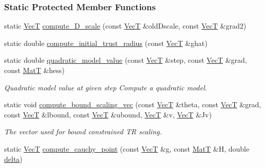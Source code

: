 \subsubsection*{Static Protected Member Functions}
\begin{DoxyCompactItemize}
\item 
static \hyperlink{namespacemappel_a2225ad69f358daa3f4f99282a35b9a3a}{VecT} \hyperlink{classmappel_1_1TrustRegionMaximizer_a6854b1dce7dc93cd5c69283c384c17de}{compute\+\_\+\+D\+\_\+scale} (const \hyperlink{namespacemappel_a2225ad69f358daa3f4f99282a35b9a3a}{VecT} \&old\+Dscale, const \hyperlink{namespacemappel_a2225ad69f358daa3f4f99282a35b9a3a}{VecT} \&grad2)
\item 
static double \hyperlink{classmappel_1_1TrustRegionMaximizer_aad1464c6bd9566f571d32dd9d10a2f78}{compute\+\_\+initial\+\_\+trust\+\_\+radius} (const \hyperlink{namespacemappel_a2225ad69f358daa3f4f99282a35b9a3a}{VecT} \&ghat)
\item 
static double \hyperlink{classmappel_1_1TrustRegionMaximizer_aed1ffcbc54355c399fbdf5a7077120b6}{quadratic\+\_\+model\+\_\+value} (const \hyperlink{namespacemappel_a2225ad69f358daa3f4f99282a35b9a3a}{VecT} \&step, const \hyperlink{namespacemappel_a2225ad69f358daa3f4f99282a35b9a3a}{VecT} \&grad, const \hyperlink{namespacemappel_a7091ab87c528041f7e2027195fad8915}{MatT} \&hess)
\begin{DoxyCompactList}\small\item\em Quadratic model value at given step Compute a quadratic model. \end{DoxyCompactList}\item 
static void \hyperlink{classmappel_1_1TrustRegionMaximizer_a1cca1ab81fd83ca9ea4c524ecfe383a0}{compute\+\_\+bound\+\_\+scaling\+\_\+vec} (const \hyperlink{namespacemappel_a2225ad69f358daa3f4f99282a35b9a3a}{VecT} \&theta, const \hyperlink{namespacemappel_a2225ad69f358daa3f4f99282a35b9a3a}{VecT} \&grad, const \hyperlink{namespacemappel_a2225ad69f358daa3f4f99282a35b9a3a}{VecT} \&lbound, const \hyperlink{namespacemappel_a2225ad69f358daa3f4f99282a35b9a3a}{VecT} \&ubound, \hyperlink{namespacemappel_a2225ad69f358daa3f4f99282a35b9a3a}{VecT} \&v, \hyperlink{namespacemappel_a2225ad69f358daa3f4f99282a35b9a3a}{VecT} \&Jv)
\begin{DoxyCompactList}\small\item\em The vector used for bound constrained TR scaling. \end{DoxyCompactList}\item 
static \hyperlink{namespacemappel_a2225ad69f358daa3f4f99282a35b9a3a}{VecT} \hyperlink{classmappel_1_1TrustRegionMaximizer_a1a4a058e06efed551704dc3a4fd120d4}{compute\+\_\+cauchy\+\_\+point} (const \hyperlink{namespacemappel_a2225ad69f358daa3f4f99282a35b9a3a}{VecT} \&g, const \hyperlink{namespacemappel_a7091ab87c528041f7e2027195fad8915}{MatT} \&H, double \hyperlink{classmappel_1_1IterativeMaximizer_a0aab5231009711a55325adbeb7d5f282}{delta})

\end{DoxyCompactItemize}
